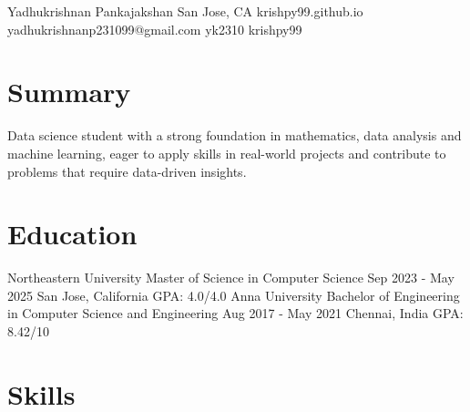 \documentclass[letterpaper]{resume_config}
\begin{document}
\Header
    {Yadhukrishnan Pankajakshan} %
    {San Jose, CA} %
    {krishpy99.github.io} %
    {yadhukrishnanp231099@gmail.com} %
    {yk2310} %
    {krishpy99} %

\section{Summary}
{
    Data science student with a strong foundation in mathematics, data analysis and machine learning, eager to apply skills in real-world projects and contribute to problems that require data-driven insights.
}


\section{Education}

\EducationExperience
    {Northeastern University} %
    {Master of Science in Computer Science} %
    {Sep 2023 - May 2025} %
    {San Jose, California} %
    {GPA: 4.0/4.0}
\EducationExperience
    {Anna University} %
    {Bachelor of Engineering in Computer Science and Engineering} %
    {Aug 2017 - May 2021} %
    {Chennai, India} %
    {GPA: 8.42/10}
\vspace{-5pt}

\section{Skills}
\end{document}

